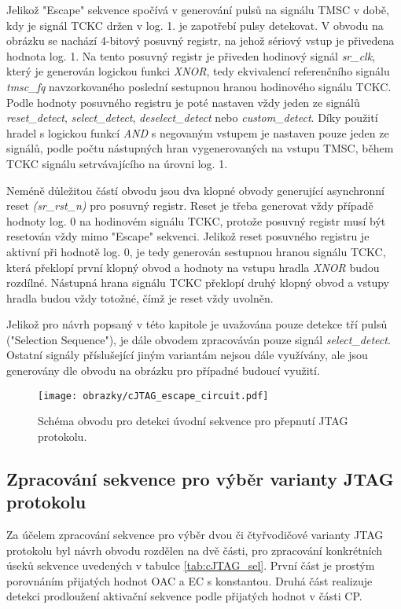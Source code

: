 Jelikož "Escape" sekvence spočívá v generování pulsů na signálu \acs{TMSC} v době, kdy je signál \acs{TCKC} držen v log. 1. je zapotřebí pulsy detekovat. V obvodu na obrázku se nachází 4-bitový posuvný registr, na jehož sériový vstup je přivedena hodnota log. 1. Na tento posuvný registr je přiveden hodinový signál \textit{sr\_clk}, který je generován logickou funkci \textit{XNOR}, tedy ekvivalencí referenčního signálu \textit{tmsc\_fq} navzorkovaného poslední sestupnou hranou hodinového signálu \acs{TCKC}. Podle hodnoty posuvného registru je poté nastaven vždy jeden ze signálů \textit{reset\_detect}, \textit{select\_detect}, \textit{deselect\_detect} nebo \textit{custom\_detect}. Díky použití hradel s logickou funkcí \textit{AND} s negovaným vstupem je nastaven pouze jeden ze signálů, podle počtu nástupných hran vygenerovaných na vstupu \acs{TMSC}, během \acs{TCKC} signálu setrvávajícího na úrovni log. 1. 

Neméně důležitou částí obvodu jsou dva klopné obvody generující asynchronní reset \textit{(sr\_rst\_n)} pro posuvný registr. Reset je třeba generovat vždy případě hodnoty log. 0 na hodinovém signálu \acs{TCKC}, protože posuvný registr musí být resetován vždy mimo "Escape" sekvenci. Jelikož reset posuvného registru je aktivní při hodnotě log. 0, je tedy generován sestupnou hranou signálu \acs{TCKC}, která překlopí první klopný obvod a hodnoty na vstupu hradla \textit{XNOR} budou rozdílné. Nástupná hrana signálu \acs{TCKC} překlopí druhý klopný obvod a vstupy hradla budou vždy totožné, čímž je reset vždy uvolněn.

Jelikož pro návrh popsaný v této kapitole je uvažována pouze detekce tří pulsů ("Selection Sequence"), je dále obvodem zpracováván pouze signál \textit{select\_detect}. Ostatní signály příslušející jiným variantám nejsou dále využívány, ale jsou generovány dle obvodu na obrázku pro případné budoucí využití.

\begin{figure}[!h]
  \begin{center}
    \texttt{[image: obrazky/cJTAG\_escape\_circuit.pdf]}
  \end{center}
  \caption{Schéma obvodu pro detekci úvodní sekvence pro přepnutí \acs{JTAG} protokolu.}
	\label{fig:cJTAG_escape_circuit}
\end{figure}

\subsection{Zpracování sekvence pro výběr varianty \acs{JTAG} protokolu}	\label{subsec:sel_seq_det}
Za účelem zpracování sekvence pro výběr dvou či čtyřvodičové varianty \acs{JTAG} protokolu byl návrh obvodu rozdělen na dvě části, pro zpracování konkrétních úseků sekvence uvedených v tabulce \ref{tab:cJTAG_sel}. První část je prostým porovnáním přijatých hodnot \acs{OAC} a \acs{EC} s konstantou. Druhá část realizuje detekci prodloužení aktivační sekvence podle přijatých hodnot v části \acs{CP}.

